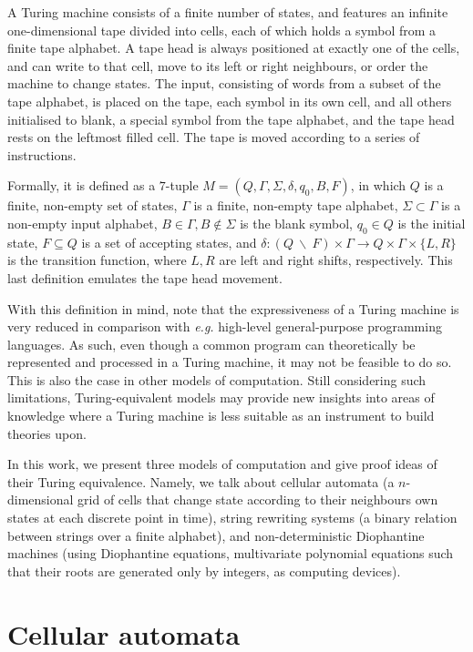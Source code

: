 \documentclass[12pt]{article}
\begin{document}
A Turing machine consists of a finite number of states, and features an
infinite one-dimensional tape divided into cells, each of which holds a symbol
from a finite tape alphabet. A tape head is always positioned at exactly one of
the cells, and can write to that cell, move to its left or right neighbours, or
order the machine to change states. The input, consisting of words from a
subset of the tape alphabet, is placed on the tape, each symbol in its own
cell, and all others initialised to blank, a special symbol from the tape
alphabet, and the tape head rests on the leftmost filled cell. The tape is
moved according to a series of instructions.

Formally, it is defined as a $7$-tuple $M = (Q, \Gamma, \Sigma, \delta, q_{0},
B, F)$, in which $Q$ is a finite, non-empty set of states, $\Gamma$ is a
finite, non-empty tape alphabet, $\Sigma \subset \Gamma$ is a non-empty input
alphabet, $B \in \Gamma, B \not\in \Sigma$ is the blank symbol, $q_{0} \in Q$
is the initial state, $F \subseteq Q$ is a set of accepting states, and $\delta
: (Q \: \backslash \: F) \times \Gamma \rightarrow Q \times \Gamma \times \{L,
R\}$ is the transition function, where $L, R$ are left and right shifts,
respectively. This last definition emulates the tape head movement.

With this definition in mind, note that the expressiveness of a Turing machine
is very reduced in comparison with \emph{e.g.} high-level general-purpose
programming languages. As such, even though a common program can theoretically
be represented and processed in a Turing machine, it may not be feasible to do
so. This is also the case in other models of computation. Still considering
such limitations, Turing-equivalent models may provide new insights into areas
of knowledge where a Turing machine is less suitable as an instrument to build
theories upon.

In this work, we present three models of computation and give proof ideas of
their Turing equivalence. Namely, we talk about cellular automata (a
$n$-dimensional grid of cells that change state according to their neighbours
own states at each discrete point in time), string rewriting systems (a binary
relation between strings over a finite alphabet), and non-deterministic
Diophantine machines (using Diophantine equations, multivariate polynomial
equations such that their roots are generated only by integers, as computing
devices).

\section{Cellular automata}\label{sec:ca}
\end{document}
